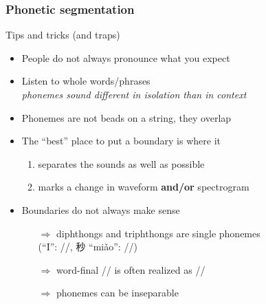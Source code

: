 \documentclass{beamer}
\begin{document}
\begin{frame} 
\frametitle{Phonetic segmentation} 
\begin{block}{Tips and tricks (and traps)}
\begin{itemize} 
\item People do not always pronounce what you expect
\item Listen to whole words/phrases \\
      \textit{phonemes sound different in isolation than in context}
\item Phonemes are not beads on a string, they overlap
\item The ``best'' place to put a boundary is where it
\begin{enumerate}
\item separates the sounds as well as possible
\item marks a change in waveform \textbf{and/or} spectrogram
\end{enumerate} 
\item Boundaries do not always make sense
\begin{itemize} 
      \item[$\Rightarrow$] diphthongs and triphthongs are single phonemes \\
      (``I'': //, 秒 ``mi\v{a}o'': //)
      \item[$\Rightarrow$] word-final // is often realized as /\textrhookschwa/
      \item[$\Rightarrow$] phonemes can be inseparable
\end{itemize}
\end{itemize}
\end{block} 
\end{frame}
\end{document}
